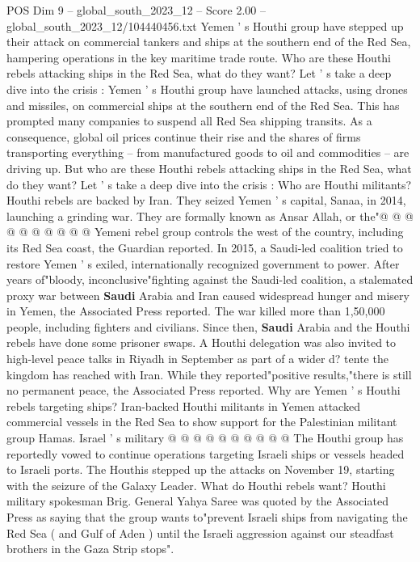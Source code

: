 \begin{textsample}{POS Dim 9 – global\_south\_2023\_12 – Score 2.00 – global\_south\_2023\_12/104440456.txt}  \label{ex:f9_pos_139}
Yemen ' s Houthi group have stepped up their attack on commercial tankers and ships at the southern end of the Red Sea, hampering operations in the key maritime trade route.
Who are these Houthi rebels attacking ships in the Red Sea, what do they want?
Let ' s take a deep dive into the crisis : Yemen ' s Houthi group have launched attacks, using drones and missiles, on commercial ships at the southern end of the Red Sea.
This has prompted many companies to suspend all Red Sea shipping transits.
As a consequence, global oil prices continue their rise and the shares of firms transporting everything -- from manufactured goods to oil and commodities -- are driving up.
But who are these Houthi rebels attacking ships in the Red Sea, what do they want?
Let ' s take a deep dive into the crisis : Who are Houthi militants?
Houthi rebels are backed by Iran.
They seized Yemen ' s capital, Sanaa, in 2014, launching a grinding war.
They are formally known as Ansar Allah, or the"@ @ @ @ @ @ @ @ @ @ Yemeni rebel group controls the west of the country, including its Red Sea coast, the Guardian reported.
In 2015, a Saudi-led coalition tried to restore Yemen ' s exiled, internationally recognized government to power.
After years of"bloody, inconclusive"fighting against the Saudi-led coalition, a stalemated proxy war between \textbf{Saudi} Arabia and Iran caused widespread hunger and misery in Yemen, the Associated Press reported.
The war killed more than 1,50,000 people, including fighters and civilians.
Since then, \textbf{Saudi} Arabia and the Houthi rebels have done some prisoner swaps.
A Houthi delegation was also invited to high-level peace talks in Riyadh in September as part of a wider d? tente the kingdom has reached with Iran.
While they reported"positive results,"there is still no permanent peace, the Associated Press reported.
Why are Yemen ' s Houthi rebels targeting ships?
Iran-backed Houthi militants in Yemen attacked commercial vessels in the Red Sea to show support for the Palestinian militant group Hamas.
Israel ' s military @ @ @ @ @ @ @ @ @ @ The Houthi group has reportedly vowed to continue operations targeting Israeli ships or vessels headed to Israeli ports.
The Houthis stepped up the attacks on November 19, starting with the seizure of the Galaxy Leader.
What do Houthi rebels want?
Houthi military spokesman Brig.
General Yahya Saree was quoted by the Associated Press as saying that the group wants to"prevent Israeli ships from navigating the Red Sea ( and Gulf of Aden ) until the Israeli aggression against our steadfast brothers in the Gaza Strip stops".

\end{textsample}
